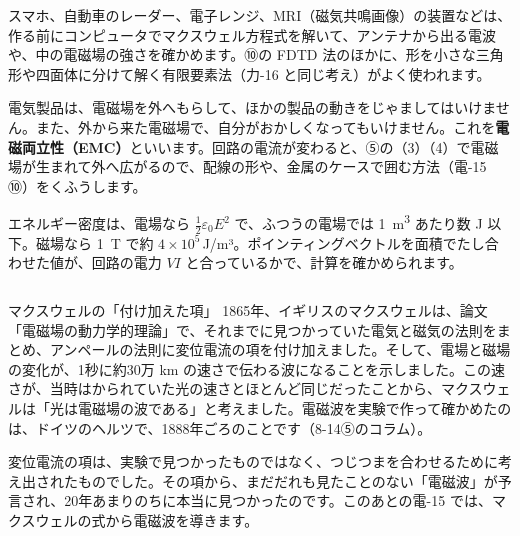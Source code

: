\begin{phkougaku}
スマホ、自動車のレーダー、電子レンジ、MRI（磁気共鳴画像）の装置などは、作る前にコンピュータでマクスウェル方程式を解いて、アンテナから出る電波や、中の電磁場の強さを確かめます。⑩の FDTD 法のほかに、形を小さな三角形や四面体に分けて解く有限要素法（力-16 と同じ考え）がよく使われます。

電気製品は、電磁場を外へもらして、ほかの製品の動きをじゃましてはいけません。また、外から来た電磁場で、自分がおかしくなってもいけません。これを\textbf{電磁両立性（EMC）}といいます。回路の電流が変わると、⑤の（3）（4）で電磁場が生まれて外へ広がるので、配線の形や、金属のケースで囲む方法（電-15 ⑩）をくふうします。

\begin{phketa}[電磁場の数]
エネルギー密度は、電場なら $\tfrac12\varepsilon_0E^2$ で、ふつうの電場では \qty{1}{m^3} あたり数 J 以下。磁場なら \qty{1}{T} で約 $4\times10^5$\,J/m³。ポインティングベクトルを面積でたし合わせた値が、回路の電力 $VI$ と合っているかで、計算を確かめられます。
\end{phketa}
\end{phkougaku}

\begin{column}{マクスウェルの「付け加えた項」}
1865年、イギリスのマクスウェルは、論文「電磁場の動力学的理論」で、それまでに見つかっていた電気と磁気の法則をまとめ、アンペールの法則に変位電流の項を付け加えました。そして、電場と磁場の変化が、1秒に約30万 km の速さで伝わる波になることを示しました。この速さが、当時はかられていた光の速さとほとんど同じだったことから、マクスウェルは「光は電磁場の波である」と考えました。電磁波を実験で作って確かめたのは、ドイツのヘルツで、1888年ごろのことです（8-14⑤のコラム）。

変位電流の項は、実験で見つかったものではなく、つじつまを合わせるために考え出されたものでした。その項から、まだだれも見たことのない「電磁波」が予言され、20年あまりのちに本当に見つかったのです。このあとの電-15 では、マクスウェルの式から電磁波を導きます。
\end{column}

